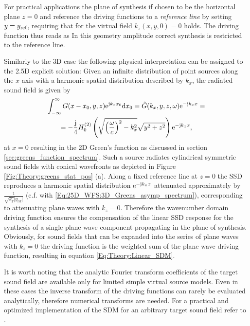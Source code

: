 For practical applications the plane of synthesis if chosen to be the horizontal plane $z=0$ and reference the driving functions to a \emph{reference line} by setting $y = y_{\mathrm{ref}}$, requiring that for the virtual field $k_z(x,y,0) = 0$ holds.
The driving function thus reads as
In this geometry amplitude correct synthesis is restricted to the reference line.

Similarly to the 3D case the following physical interpretation can be assigned to the 2.5D explicit solution:
Given an infinite distribution of point sources along the $x$-axis with a harmonic spatial distribution described by $k_x$, the radiated sound field is given by
\begin{multline}
\int_{-\infty}^{\infty} G(x - x_0,y,z) \mathrm{e}^{\mathrm{j} k_x x_0} \mathrm{d} x_0 = \hat{G}(k_x,y,z,\omega) \mathrm{e}^{-\mathrm{j} k_x x} = \\
=  -\frac{\mathrm{j}}{4} H_0^{(2)}\left( \sqrt{\left( \frac{\omega}{c} \right)^2-k_x^2} \sqrt{y^2+z^2} \right)  \mathrm{e}^{-\mathrm{j} k_x x},
\end{multline}
at $x=0$ resulting in the 2D Green's function as discussed in section \ref{sec:greens_function_spectrum}.
Such a source radiates cylindrical symmetric sound fields with conical wavefronts as depicted in Figure \eqref{Fig:Theory:greens_stat_pos} (a). 
Along a fixed reference line at $z=0$ the SSD reproduces a harmonic spatial distribution $\mathrm{e}^{-\mathrm{j} k_x x}$ attenuated approximately by $\frac{1}{\sqrt{k_y}|y_{\mathrm{ref}}|}$ (c.f. with \eqref{Eq:25D_WFS:3D_Greens_asymp_spectrum}), corresponding to attenuating plane waves with $k_z=0$.
Therefore the wavenumber domain driving function ensures the compensation of the linear SSD response for the synthesis of a single plane wave component propagating in the plane of synthesis.
Obviously, for sound fields that can be expanded into the series of plane waves with $k_z=0$ the driving function is the weighted sum of the plane wave driving function, resulting in equation \eqref{Eq:Theory:Linear_SDM}.

It is worth noting that the analytic Fourier transform coefficients of the target sound field are available only for limited simple virtual source models. 
Even in these cases the inverse transform of the driving functions can rarely be evaluated analytically, therefore numerical transforms are needed.
For a practical and optimized implementation of the SDM for an arbitrary target sound field refer to \cite{ahrens2013a:efficientSDM}.

